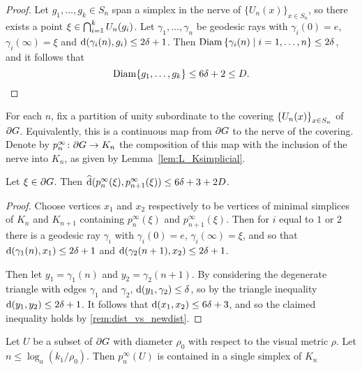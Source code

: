 \documentclass[a4paper]{article}
\begin{document}
\begin{proof}
  Let $g_1, \dotsc, g_k \in S_n$ span a simplex in the nerve of
  $\{U_n(x)\}_{x \in S_n}$, so there exists a point $\xi \in
  \bigcap_{i=1}^k U_n(g_i)$.  Let $\gamma_1, \dotsc, \gamma_n$ be
  geodesic rays with $\gamma_i(0) = e$, $\gamma_i(\infty) = \xi$ and
  $\operatorname{d}(\gamma_i(n), g_i) \leq 2\delta+1$.  Then $\operatorname{Diam}\left\{\gamma_i(n)
  \mid i=1, \dotsc, n\right\} \leq 2\delta$, and it follows that
  \begin{equation*}
    \operatorname{Diam}\{g_1, \dotsc, g_k\} \leq 6\delta+ 2 \leq D.\qedhere
  \end{equation*}
\end{proof}

\begin{definition}
  For each $n$, fix a partition of unity subordinate to the covering
  $\left\{U_n(x)\right\}_{x \in S_n}$ of $\partial G$. Equivalently, this is a
  continuous map from $\partial G$ to the nerve of the covering. Denote by
  $p^\infty_n\colon \partial G \to K_n$ the composition of this map with the
  inclusion of the nerve into $K_n$, as given by Lemma~\ref{lem:L_Ksimplicial}.
\end{definition}

\begin{lemma}\label{lem:close_projections}
  Let $\xi \in \partial G$. Then $\operatorname{\widehat{d}}(p^\infty_n(\xi),
  p^\infty_{n+1}(\xi)) \leq 6\delta+3 + 2D$.
\end{lemma}

\begin{proof}
  Choose vertices $x_1$ and $x_2$ respectively to be vertices of minimal
  simplices of $K_n$ and $K_{n+1}$ containing $p^\infty_n(\xi)$ and
  $p^\infty_{n+1}(\xi)$. Then for $i$ equal to $1$ or $2$ there is a geodesic
  ray $\gamma_i$ with $\gamma_i(0) = e$, $\gamma_i(\infty) = \xi$, and so that
  $\operatorname{d}(\gamma_1(n), x_1) \leq 2\delta+1$ and $\operatorname{d}(\gamma_2(n+1),
  x_2) \leq 2\delta+1$.

  Then let $y_1 = \gamma_1(n)$ and $y_2 = \gamma_2(n+1)$. By considering the
  degenerate triangle with edges $\gamma_1$ and $\gamma_2$,
  $\operatorname{d}(y_1, \gamma_2) \leq \delta$, so by the triangle inequality
  $\operatorname{d}(y_1, y_2) \leq 2\delta +1$. It follows that $\operatorname{d}(x_1, x_2)
  \leq 6\delta+3$, and so the claimed inequality holds by
  \cref{rem:dist_vs_newdist}.
\end{proof}

\begin{proposition}\label{prop:projectstoasimplex}
  Let $U$ be a subset of $\partial G$ with diameter $\rho_0$ with respect to
  the visual metric $\rho$. Let $n \leq \log_a(k_1/\rho_0)$. Then
  $p^\infty_n(U)$ is contained in a single simplex of $K_n$
\end{proposition}
\end{document}
